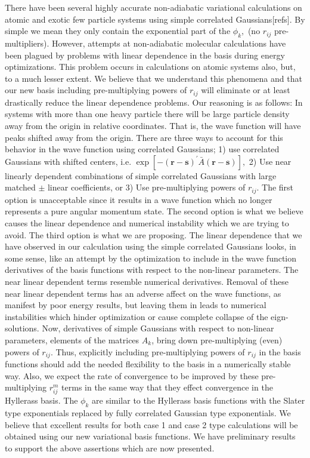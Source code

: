 \documentclass[12pt,thmsa]{article}
\begin{document}
There have been several highly accurate non-adiabatic variational
calculations on atomic and exotic few particle systems using simple
correlated Gaussians[refs]. By simple we mean they only contain the
exponential part of the $\phi _k,$ (no $r_{ij}$ pre-multipliers). However,
attempts at non-adiabatic molecular calculations have been plagued by
problems with linear dependence in the basis during energy optimizations.
This problem occurs in calculations on atomic systems also, but, to a much
lesser extent. We believe that we understand this phenomena and that our new
basis including pre-multiplying powers of $r_{ij}$ will eliminate or at
least drastically reduce the linear dependence problems. Our reasoning is as
follows: In systems with more than one heavy particle there will be large
particle density away from the origin in relative coordinates. That is, the
wave function will have peaks shifted away from the origin. There are three
ways to account for this behavior in the wave function using correlated
Gaussians; 1) use correlated Gaussians with shifted centers, i.e. $\exp
[-\left( \mathbf{r-s}\right) ^{\prime }\bar{A}\left( \mathbf{r-s}\right) ],$
2) Use near linearly dependent combinations of simple correlated Gaussians
with large matched $\pm $ linear coefficients, or 3) Use pre-multiplying
powers of $r_{ij}$. The first option is unacceptable since it results in a
wave function which no longer represents a pure angular momentum state. The
second option is what we believe causes the linear dependence and numerical
instability which we are trying to avoid. The third option is what we are
proposing. The linear dependence that we have observed in our calculation
using the simple correlated Gaussians looks, in some sense, like an attempt
by the optimization to include in the wave function derivatives of the basis
functions with respect to the non-linear parameters. The near linear
dependent terms resemble numerical derivatives. Removal of these near linear
dependent terms has an adverse affect on the wave functions, as manifest by
poor energy results, but leaving them in leads to numerical instabilities
which hinder optimization or cause complete collapse of the eign-solutions.
Now, derivatives of simple Gaussians with respect to non-linear parameters,
elements of the matrices $A_k$, bring down pre-multiplying (even) powers of $%
r_{ij}$. Thus, explicitly including pre-multiplying powers of $r_{ij}$ in
the basis functions should add the needed flexibility to the basis in a
numerically stable way. Also, we expect the rate of convergence to be
improved by these pre-multiplying $r_{ij}^m$ terms in the same way that they
effect convergence in the Hyllerass basis. The $\phi _k$ are similar to the
Hyllerass basis functions with the Slater type exponentials replaced by
fully correlated Gaussian type exponentials. We believe that excellent
results for both case 1 and case 2 type calculations will be obtained using
our new variational basis functions. We have preliminary results to support
the above assertions which are now presented.
\end{document}
